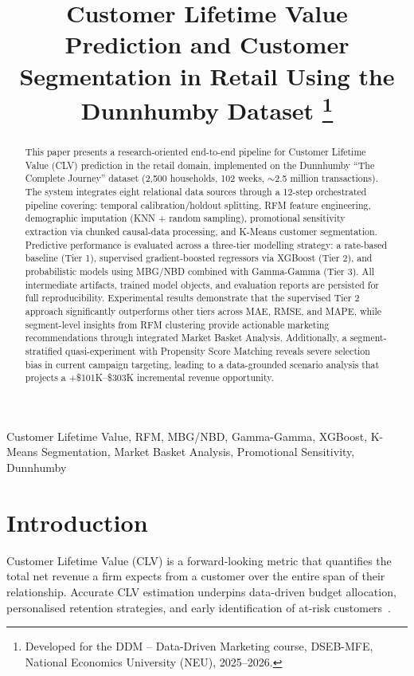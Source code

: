 \documentclass[conference]{IEEEtran}
\title{Customer Lifetime Value Prediction and Customer Segmentation in Retail Using the Dunnhumby Dataset%
\thanks{Developed for the DDM -- Data-Driven Marketing course,
        DSEB-MFE, National Economics University (NEU), 2025--2026.}}
\author{%
  \IEEEauthorblockN{DSEB65A -- Group 6}
  \IEEEauthorblockA{DSEB-MFE, National Economics University\\
    Course: Data-Driven Marketing (DDM)\\
    Contact: truonghoangtung25@gmail.com}
}
\begin{document}
\maketitle

\begin{abstract}
This paper presents a research-oriented end-to-end pipeline for
Customer Lifetime Value (CLV) prediction in the retail domain,
implemented on the Dunnhumby ``The Complete Journey'' dataset
(2,500 households, 102 weeks, ${\sim}$2.5 million transactions).
The system integrates eight relational data sources through a
12-step orchestrated pipeline covering: temporal
calibration/holdout splitting, RFM feature engineering,
demographic imputation (KNN + random sampling), promotional sensitivity
extraction via chunked causal-data processing, and K-Means customer
segmentation. Predictive performance is evaluated across a 
three-tier modelling strategy: a rate-based baseline (Tier 1), 
supervised gradient-boosted regressors via XGBoost (Tier 2), 
and probabilistic models using MBG/NBD combined with Gamma-Gamma (Tier 3). 
All intermediate artifacts, trained model objects, and evaluation 
reports are persisted for full reproducibility. Experimental results 
demonstrate that the supervised Tier 2 approach significantly 
outperforms other tiers across MAE, RMSE, and MAPE, while segment-level 
insights from RFM clustering provide actionable marketing 
recommendations through integrated Market Basket Analysis.
Additionally, a segment-stratified quasi-experiment with Propensity 
Score Matching reveals severe selection bias in current campaign 
targeting, leading to a data-grounded scenario analysis that 
projects a +\$101K--\$303K incremental revenue opportunity.
\end{abstract}

\begin{IEEEkeywords}
Customer Lifetime Value, RFM, MBG/NBD, Gamma-Gamma, XGBoost, K-Means Segmentation, Market Basket Analysis,
Promotional Sensitivity, Dunnhumby
\end{IEEEkeywords}

\section{Introduction}
\label{sec:intro}

Customer Lifetime Value (CLV) is a forward-looking metric that
quantifies the total net revenue a firm expects from a customer
over the entire span of their relationship. Accurate CLV
estimation underpins data-driven budget allocation, personalised
retention strategies, and early identification of at-risk
customers~\cite{fader2005}.
\end{document}

